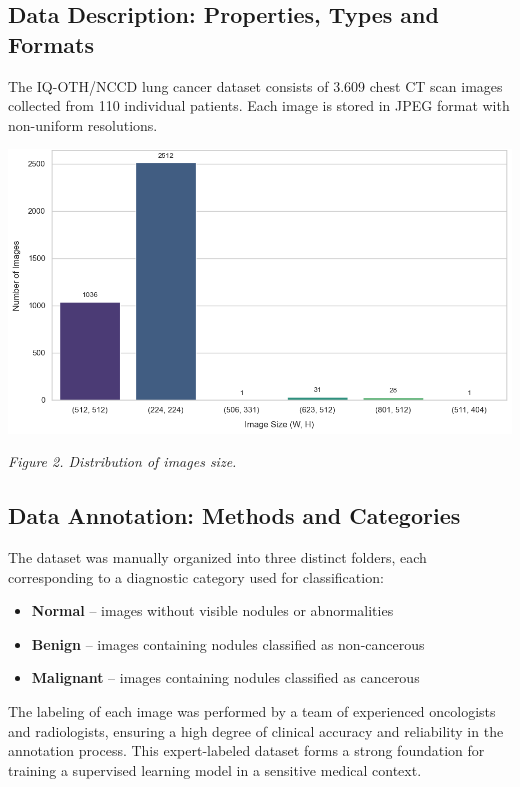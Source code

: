 \subsection{Data Description: Properties, Types and Formats}
The IQ-OTH/NCCD lung cancer dataset consists of 3.609 chest CT scan images collected from 110 
individual patients. Each image is stored in JPEG format with non-uniform resolutions. 

\vspace{1em}
\begin{center} 
    \includegraphics[width=\textwidth]{../assets/02-dataset/image-size-distribution.png}

    \small\textit{Figure 2. Distribution of images size.}
\end{center}
\vspace{1em}

\subsection{Data Annotation: Methods and Categories}
The dataset was manually organized into three distinct folders, each corresponding to a diagnostic 
category used for classification:
\begin{itemize}
    \item \textbf{Normal} – images without visible nodules or abnormalities
    
    \item \textbf{Benign} – images containing nodules classified as non-cancerous
    
    \item \textbf{Malignant} – images containing nodules classified as cancerous
\end{itemize}  
 

The labeling of each image was performed by a team of experienced oncologists and radiologists, 
ensuring a high degree of clinical accuracy and reliability in the annotation process. This 
expert-labeled dataset forms a strong foundation for training a supervised learning model in a 
sensitive medical context.

